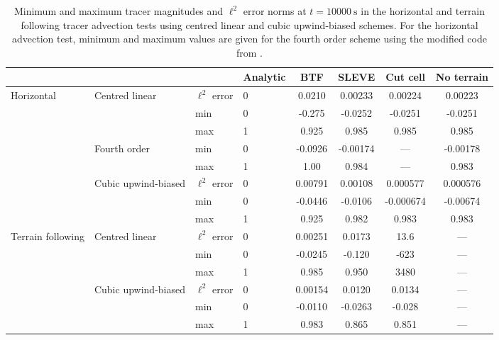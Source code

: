 \documentclass[twocol]{ametsoc}
\begin{document}
\begin{table*}[t]
	\caption{Minimum and maximum tracer magnitudes and \(\ell^2\) error norms at \(t = \SI{10000}{\second}\) in the horizontal and terrain following tracer advection tests using centred linear and cubic upwind-biased schemes.  For the horizontal advection test, minimum and maximum values are given for the fourth order scheme using the modified code from \citet{schaer2002}.}
\label{tab:advection}
%
\centering
\footnotesize
\begin{tabular}{l l l l S S S S}
\hline\hline
                  &                     &                  & Analytic & {BTF}   & {SLEVE}         & {Cut cell}     & {No terrain} \\
\hline
Horizontal        & Centred linear      & \(\ell^2\) error & 0        & 0.0210  & 0.00233         & 0.00224        & 0.00223     \\
                  &                     & min              & 0        & -0.275  & -0.0252         & -0.0251        & -0.0251     \\
                  &                     & max              & 1        & 0.925   & 0.985           & 0.985          & 0.985       \\
                  & Fourth order        & min              & 0        & -0.0926 & -0.00174        & {---}          & -0.00178    \\
                  &                     & max              & 1        & 1.00    & 0.984           & {---}          & 0.983       \\
                  & Cubic upwind-biased & \(\ell^2\) error & 0        & 0.00791 & 0.00108         & 0.000577       & 0.000576    \\
                  &                     & min              & 0        & -0.0446 & -0.0106         & -0.000674      & -0.00674    \\
                  &                     & max              & 1        & 0.925   & 0.982           & 0.983          & 0.983       \\
\hline
Terrain following & Centred linear      & \(\ell^2\) error & 0        & 0.00251 & 0.0173          & 13.6           & {---}        \\
		  &                     & min              & 0        & -0.0245 & -0.120          & -623           & {---}        \\
                  &                     & max              & 1        & 0.985   & 0.950           & 3480           & {---}        \\
		  & Cubic upwind-biased & \(\ell^2\) error & 0        & 0.00154 & 0.0120          & 0.0134         & {---}        \\
                  &                     & min              & 0        & -0.0110 & -0.0263         & -0.028         & {---}        \\
                  &                     & max              & 1        & 0.983   & 0.865           & 0.851          & {---}        \\
\hline
\end{tabular}
\end{table*}
\end{document}
